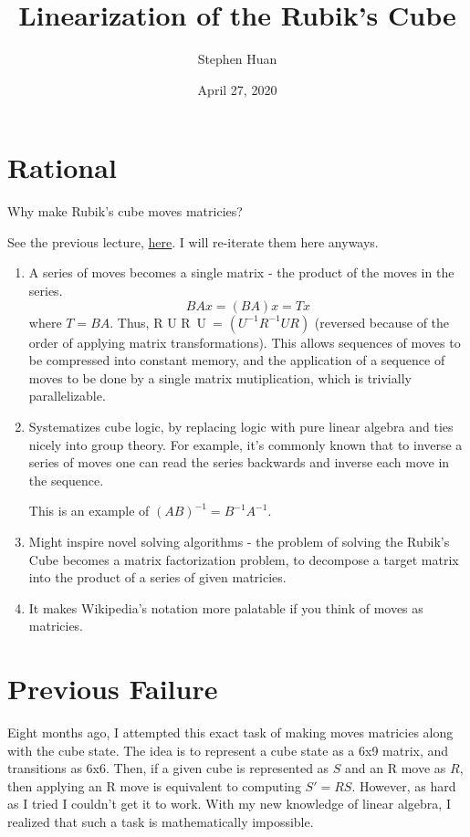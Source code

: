 \documentclass[11pt, oneside]{article}
\title{Linearization of the Rubik's Cube}
\author{Stephen Huan}
\date{April 27, 2020}
\newcommand{\dash}{\textquotesingle}
\theoremstyle{plain}
\begin{document}
\maketitle

\section{Rational}
Why make Rubik's cube moves matricies?

See the previous lecture, \href{https://activities.tjhsst.edu/cubing/static/pdfs/Matricization/matrix.pdf}{here}. I will re-iterate them here anyways.
\begin{enumerate}
  \item A series of moves becomes a single matrix - the product of the moves
  in the series.
  \[ BAx = (BA)x = Tx \] where \( T = BA \).
  Thus, R U R\dash \ U\dash \ = \( (U^{-1} R^{-1} U R) \)
  (reversed because of the order of applying matrix transformations).
  This allows sequences of moves to be compressed into constant memory,
  and the application of a sequence of moves to be done by a single matrix mutiplication,
  which is trivially parallelizable.

  \item Systematizes cube logic, by replacing logic with pure linear algebra
  and ties nicely into group theory.
  For example, it's commonly known that to inverse a series of moves
  one can read the series backwards and inverse each move in the sequence.

  This is an example of \( (AB)^{-1} = B^{-1}A^{-1} \).

  \item Might inspire novel solving algorithms - the problem of solving the Rubik's Cube
  becomes a matrix factorization problem, to decompose a target matrix into the
  product of a series of given matricies.

  \item It makes Wikipedia's notation more palatable if you think of moves as matricies.
\end{enumerate}

\section{Previous Failure}
Eight months ago, I attempted this exact task of making moves matricies along
with the cube state. The idea is to represent a cube state as a 6x9 matrix,
and transitions as 6x6. Then, if a given cube is represented as \( S \)
and an R move as \( R \), then applying an R move is equivalent to
computing \( S' = R S \). However, as hard as I tried I couldn't get it to work.
With my new knowledge of linear algebra, I realized that such a task is
mathematically impossible.
\end{document}
